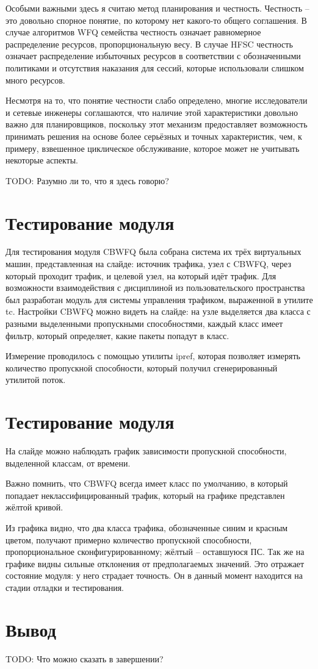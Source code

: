 \documentclass[12pt]{ncc}
\begin{document}
	Особыми важными здесь я считаю метод планирования и честность.
	Честность -- это довольно спорное понятие, по которому нет
	какого-то общего соглашения. В случае алгоритмов WFQ семейства
	честность означает равномерное распределение ресурсов, пропорциональную
	весу. В случае HFSC честность означает распределение избыточных
	ресурсов в соответствии с обозначенными политиками и отсутствия
	наказания для сессий, которые использовали слишком много ресурсов.

	Несмотря на то, что понятие честности слабо определено, многие
	исследователи и сетевые инженеры соглашаются, что наличие этой
	характеристики довольно важно для планировщиков, поскольку
	этот механизм предоставляет возможность принимать решения
	на основе более серьёзных и точных характеристик, чем,
	к примеру, взвешенное циклическое обслуживание, которое
	может не учитывать некоторые аспекты.

	TODO: Разумно ли то, что я здесь говорю?

	\section{Тестирование модуля}

	Для тестирования модуля CBWFQ была собрана система их трёх виртуальных
	машин, представленная на слайде: источник трафика, узел с CBWFQ, через
	который проходит трафик, и целевой узел, на который
	идёт трафик. Для возможности взаимодействия с дисциплиной из
	пользовательского пространства был разработан модуль для системы
	управления трафиком, выраженной в утилите tc. Настройки
	CBWFQ можно видеть на слайде: на узле выделяется два класса
	с разными выделенными пропускными способностями, каждый класс имеет
	фильтр, который определяет, какие пакеты попадут в класс.

	Измерение проводилось с помощью утилиты ipref, которая позволяет
	измерять количество пропускной способности, который получил
	сгенерированный утилитой поток. 
	
	\section{Тестирование модуля}

	На слайде можно наблюдать график зависимости пропускной способности,
	выделенной классам, от времени. 

	Важно помнить, что CBWFQ всегда имеет класс по умолчанию, в который
	попадает неклассифицированный трафик, который на графике представлен
	жёлтой кривой. 

	Из графика видно, что два класса трафика, обозначенные синим и красным цветом,
	получают примерно количество пропускной способности, пропорциональное
	сконфигурированному; жёлтый -- оставшуюся ПС. Так же на графике видны
	сильные отклонения от предполагаемых значений. Это отражает состояние модуля: у него
	страдает точность. Он в данный момент находится на стадии
	отладки и тестирования.

	\section{Вывод}


	TODO: Что можно сказать в завершении?
\end{document}
